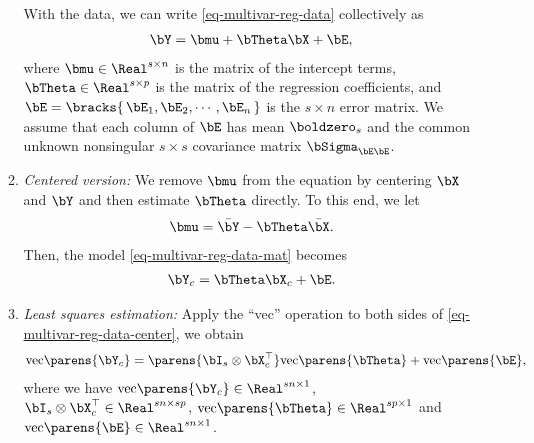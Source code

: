 \documentclass[12pt]{article}
\begin{document}
\begin{enumerate}[label=\textbf{\arabic*.}]
\begin{enumerate}
		With the data, we can write \eqref{eq-multivar-reg-data} collectively as 
		\begin{align}\label{eq-multivar-reg-data-mat}
			\bY = \bmu + \bTheta \bX + \bE, 
		\end{align}
		where $\bmu \in \Real^{s \times n}$ is the matrix of the intercept terms, $\bTheta \in \Real^{s \times p}$ is the matrix of the regression coefficients, and $\bE = \bracks{\, \bE_1, \bE_2, \cdots, \bE_n \,}$ is the $s \times n$ error matrix. We assume that each column of $\bE$ has mean $\boldzero_{s}$ and the common unknown nonsingular $s \times s$ covariance matrix $\bSigma_{\bE \bE}$. 
		
		\item \textit{Centered version:} We remove $\bmu$ from the equation by centering $\bX$ and $\bY$ and then estimate $\bTheta$ directly. To this end, we let 
		\begin{align}\label{eq-center-mu}
			\bmu = \bar{\bY} - \bTheta \bar{\bX}. 
		\end{align}
		Then, the model \eqref{eq-multivar-reg-data-mat} becomes 
		\begin{align}\label{eq-multivar-reg-data-center}
			\bY_c = \bTheta \bX_c + \bE. 
		\end{align}
		
		\item \textit{Least squares estimation:} Apply the ``vec'' operation to both sides of \eqref{eq-multivar-reg-data-center}, we obtain 
		\begin{align}\label{eq-multivar-reg-data-center-vec}
			\mathrm{vec} \parens{\bY_c} = \parens{\bI_s \otimes \bX_c^{\top}} \mathrm{vec} \parens{\bTheta} + \mathrm{vec} \parens{\bE}, 
		\end{align}
		where we have $\mathrm{vec} \parens{\bY_c} \in \Real^{sn \times 1}$, $\bI_s \otimes \bX_c^{\top} \in \Real^{sn \times sp}$, $\mathrm{vec} \parens{\bTheta} \in \Real^{sp \times 1}$ and $\mathrm{vec} \parens{\bE} \in \Real^{sn \times 1}$. 
		

\end{enumerate}
\end{enumerate}
\end{document}
